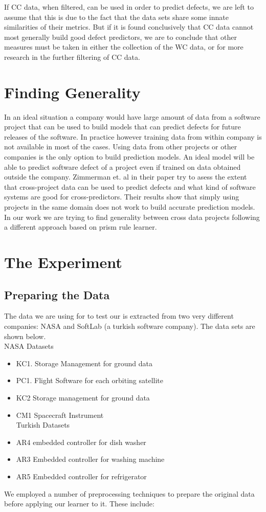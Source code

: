 \documentclass{sig-alternate}
\begin{document}
If CC data, when filtered, can be used in order to predict defects, we are left to assume that this is due to the fact that the data sets share some innate similarities of their metrics. But if it is found conclusively that CC data cannot most generally build good defect predictors, we are to conclude that other measures must be taken in either the collection of the WC data, or for more research in the further filtering of CC data.


\section{Finding Generality}
In an ideal situation a company would have large amount of data from a software project that can be used to build models that can predict defects for
future releases of the software. In practice however training data from within company is not available in most of the cases. Using data from other projects or other companies is the only option to build prediction models. An ideal model will be able to predict software defect of a project even if trained on data obtained outside the company. Zimmerman et. al in their paper
try to asess the extent that cross-project data can be used to predict defects and what kind of software systems are good for cross-predictors. Their results
show that simply using projects in the same domain does not work to build accurate prediction models. In our work we are trying to find generality
between cross data projects following a different approach based on prism rule learner.

\section{The Experiment}


\subsection{Preparing the Data}
The data we are using for to test our is extracted from two very different companies: NASA and SoftLab (a turkish software company). The data sets are shown below.
\\NASA Datasets
\begin{itemize}
\item{ KC1. Storage Management for ground data }
\item{PC1. Flight Software for each orbiting satellite}
\item{KC2 Storage management for ground data}
\item{CM1} Spacecraft Instrument
\\Turkish Datasets
\item {AR4} embedded controller for dish washer
\item{AR3} Embedded controller for washing machine
\item{AR5} Embedded controller for refrigerator
\end{itemize}
We employed a number of preprocessing techniques to prepare the original data before applying our learner to it. These include:
\end{document}
